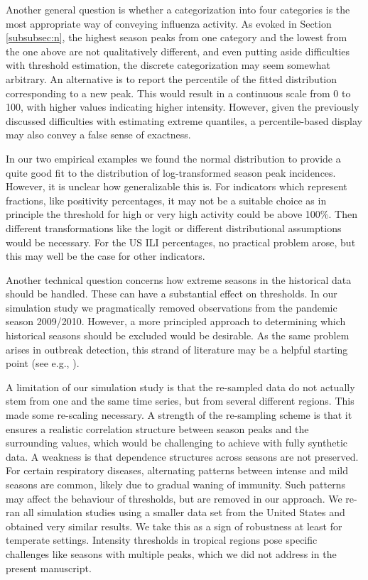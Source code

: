 \documentclass{article}
\begin{document}
Another general question is whether a categorization into four categories is the most appropriate way of conveying influenza activity. As evoked in Section \ref{subsubsec:n}, the highest season peaks from one category and the lowest from the one above are not qualitatively different, and even putting aside difficulties with threshold estimation, the discrete categorization may seem somewhat arbitrary. An alternative is to report the percentile of the fitted distribution corresponding to a new peak. This would result in a continuous scale from 0 to 100, with higher values indicating higher intensity. However, given the previously discussed difficulties with estimating extreme quantiles, a percentile-based display may also convey a false sense of exactness.

In our two empirical examples we found the normal distribution to provide a quite good fit to the distribution of log-transformed season peak incidences. However, it is unclear how generalizable this is. For indicators which represent fractions, like positivity percentages, it may not be a suitable choice as in principle the threshold for high or very high activity could be above 100\%. Then different transformations like the logit or different distributional assumptions would be necessary. For the US ILI percentages, no practical problem arose, but this may well be the case for other indicators.

Another technical question concerns how extreme seasons in the historical data should be handled. These can have a substantial effect on thresholds. In our simulation study we pragmatically removed observations from the pandemic season 2009/2010. However, a more principled approach to determining which historical seasons should be excluded would be desirable. As the same problem arises in outbreak detection, this strand of literature may be a helpful starting point (see e.g., \citealt{Noufaily2013}).



A limitation of our simulation study is that the re-sampled data do not actually stem from one and the same time series, but from several different regions. This made some re-scaling necessary. A strength of the re-sampling scheme is that it ensures a realistic correlation structure between season peaks and the surrounding values, which would be challenging to achieve with fully synthetic data. A weakness is that dependence structures across seasons are not preserved. For certain respiratory diseases, alternating patterns between intense and mild seasons are common, likely due to gradual waning of immunity. Such patterns may affect the behaviour of thresholds, but are removed in our approach. We re-ran all simulation studies using a smaller data set from the United States and obtained very similar results. We take this as a sign of robustness at least for temperate settings. Intensity thresholds in tropical regions pose specific challenges like seasons with multiple peaks, which we did not address in the present manuscript.
\end{document}
